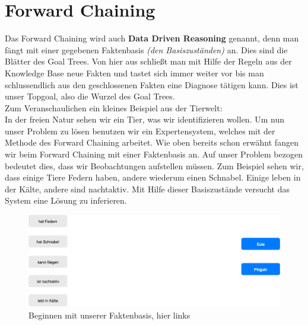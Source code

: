 \section{Forward Chaining}
\noindent Das Forward Chaining wird auch \textbf{Data Driven Reasoning} genannt, denn man fängt mit einer gegebenen Faktenbasis \textit{(den Basiszuständen)} an. Dies sind die Blätter des Goal Trees. Von hier aus schließt man mit Hilfe der Regeln aus der Knowledge Base neue Fakten und tastet sich immer weiter vor bis man schlussendlich aus den geschlossenen Fakten eine Diagnose tätigen kann. Dies ist unser Topgoal, also die Wurzel des Goal Trees.\\

\noindent Zum Veranschaulichen ein kleines Beispiel aus der Tierwelt:\\
In der freien Natur sehen wir ein Tier, was wir identifizieren wollen. Um nun unser Problem zu lösen benutzen wir ein Expertensystem, welches mit der Methode des Forward Chaining arbeitet.
Wie oben bereits schon erwähnt fangen wir beim Forward Chaining mit einer Faktenbasis an. Auf unser Problem bezogen bedeutet dies, dass wir Beobachtungen aufstellen müssen. Zum Beispiel sehen wir, dass einige Tiere Federn haben, andere wiederum einen Schnabel. Einige leben in der Kälte, andere sind nachtaktiv. Mit Hilfe dieser Basiszustände versucht das System eine Lösung zu inferieren.\\

\begin{figure}[H]
    \centering
    \includegraphics[width=17cm]{chapters/expertensysteme/forward_chaining/forward_chaining_1}
    \caption{Beginnen mit unserer Faktenbasis, hier links}
    \label{fig:forward_chaining_1}
\end{figure}

